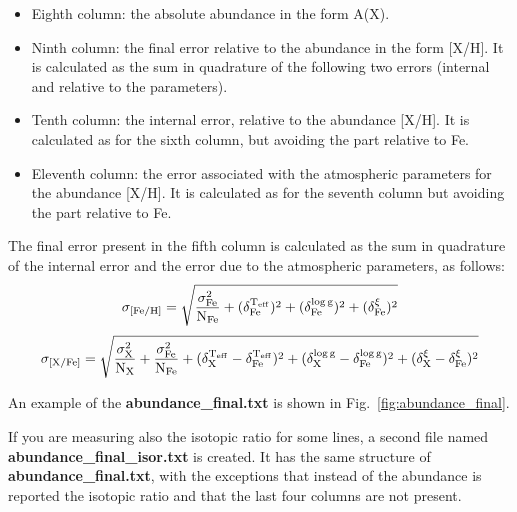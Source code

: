 \documentclass[modern]{aastex701}
\begin{document}
\begin{itemize}
\begin{equation}
        \label{eq:par_fe}
    \end{equation}
    \begin{equation}
         \rm \sigma_{[X/Fe]}  
          = \sqrt{(\delta_{X}^{T_{\mathrm{eff}}} - \delta_{Fe}^{T_{\mathrm{eff}}})^2 + (\delta_{X}^{\log g} - \delta_{Fe}^{\log g})^2 + (\delta_{X}^{\xi} - \delta_{Fe}^{\xi})^2}
          \label{eq:par_xfe}
    \end{equation}
    \item Eighth column: the absolute abundance in the form A(X).
    \item Ninth column: the final error relative to the abundance in the form [X/H]. It is calculated as the sum in quadrature of the following two errors (internal and relative to the parameters).
    \item Tenth column: the internal error, relative to the abundance [X/H]. It is calculated as for the sixth column, but avoiding the part relative to Fe.
    \item Eleventh column: the error associated with the atmospheric parameters for the abundance [X/H]. It is calculated as for the seventh column but avoiding the part relative to Fe. 
\end{itemize}

The final error present in the fifth column is calculated as the sum in quadrature of the internal error and the error due to the atmospheric parameters, as follows:     \begin{equation}
    \rm   \sigma_{[Fe/H]}=\sqrt{\frac{\sigma_{Fe}^2}{N_{Fe}}+(\delta_{Fe}^{T_{\mathrm{eff}}})^2+ (\delta_{Fe}^{\log g})^2 + (\delta_{Fe}^{\xi})^2}
        \label{eq:1}
\end{equation}
%
\begin{equation}
    \rm      \sigma_{[X/Fe]}  
          = \sqrt{\frac{\sigma_{X}^2}{N_{X}} + \frac{\sigma_{Fe}^2}{N_{Fe}} + (\delta_{X}^{T_{\mathrm{eff}}} - \delta_{Fe}^{T_{\mathrm{eff}}})^2 + (\delta_{X}^{\log g} - \delta_{Fe}^{\log g})^2 + (\delta_{X}^{\xi} - \delta_{Fe}^{\xi})^2}
          \label{eq:2}
\end{equation}

An example of the {\bf abundance\_final.txt} is shown in Fig.~\ref{fig:abundance_final}. 

If you are measuring also the isotopic ratio for some lines, a second file named {\bf abundance\_final\_isor.txt} is created. It has the same structure of {\bf abundance\_final.txt}, with the exceptions that instead of the abundance is reported the isotopic ratio and that the last four columns are not present. 
\end{document}
